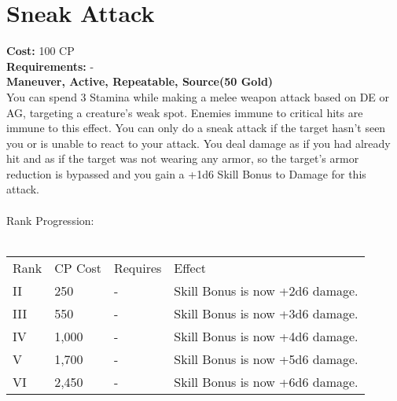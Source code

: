 \section{Sneak Attack}\label{maneuver:sneakAttack}
\textbf{Cost:} 100 CP\\
\textbf{Requirements:} -\\
\textbf{Maneuver, Active, Repeatable, Source(50 Gold)}\\
You can spend 3 Stamina while making a melee weapon attack based on DE or AG, targeting a creature's weak spot.
Enemies immune to critical hits are immune to this effect.
You can only do a sneak attack if the target hasn't seen you or is unable to react to your attack.
You deal damage as if you had already hit and as if the target was not wearing any armor, so the target's armor reduction is bypassed and you gain a +1d6 Skill Bonus to Damage for this attack.\\
\\
Rank Progression:\\
\\
\begin{tabular}{l | l | l | l}
	Rank & CP Cost & Requires & Effect\\
	II & 250 & - & Skill Bonus is now +2d6 damage.\\
	III & 550 & - &  Skill Bonus is now +3d6 damage.\\
	IV & 1,000 & - &  Skill Bonus is now +4d6 damage.\\
	V & 1,700 & - &  Skill Bonus is now +5d6 damage.\\
	VI & 2,450 & - &  Skill Bonus is now +6d6 damage.\\
\end{tabular}